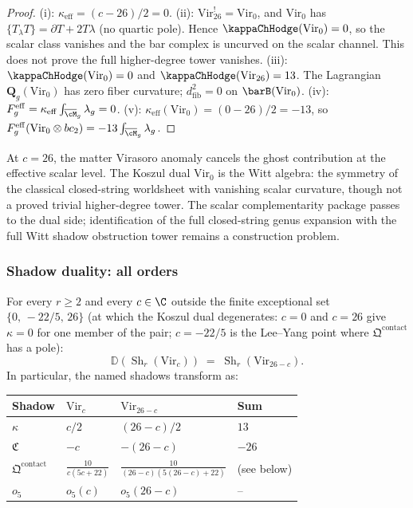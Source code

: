 \begin{proof}
(i): $\kappa_{\mathrm{eff}} = (c-26)/2 = 0$.
(ii): $\mathrm{Vir}_{26}^! = \mathrm{Vir}_0$, and
$\mathrm{Vir}_0$ has $\{T_\lambda T\} = \partial T + 2T\lambda$
(no quartic pole). Hence $\kappaChHodge(\mathrm{Vir}_0) = 0$, so the
scalar class vanishes and the bar complex is uncurved on the scalar
channel. This does not prove the full higher-degree tower vanishes.
(iii): $\kappaChHodge(\mathrm{Vir}_0) = 0$ and $\kappaChHodge(\mathrm{Vir}_{26})
= 13$. The Lagrangian $\mathbf{Q}_g(\mathrm{Vir}_0)$ has zero
fiber curvature; $d_{\mathrm{fib}}^2 = 0$ on $\barB(\mathrm{Vir}_0)$.
(iv): $F_g^{\mathrm{eff}} = \kappa_{\mathrm{eff}} \int_{\overline{\cM}_g} \lambda_g
= 0$.
(v): $\kappa_{\mathrm{eff}}(\mathrm{Vir}_0) = (0-26)/2 = -13$,
so $F_g^{\mathrm{eff}}(\mathrm{Vir}_0 \otimes bc_2)
= -13 \int_{\overline{\cM}_g} \lambda_g$.
\end{proof}

At $c = 26$, the matter Virasoro anomaly cancels the ghost
contribution at the effective scalar level. The Koszul dual
$\mathrm{Vir}_0$ is the Witt algebra: the symmetry of the
classical closed-string worldsheet with vanishing scalar
curvature, though not a proved trivial higher-degree tower.
The scalar complementarity package passes to the dual side;
identification of the full closed-string genus expansion with
the full Witt shadow obstruction tower remains a construction
problem.

\subsubsection*{Shadow duality: all orders}

\begin{theorem}
\label{thm:gravity-shadow-duality}
For every $r \ge 2$ and every $c \in \C$ outside the
finite exceptional set $\{0,\, -22/5,\, 26\}$
\textup{(}at which the Koszul dual degenerates: $c = 0$ and
$c = 26$ give $\kappa = 0$ for one member of the pair;
$c = -22/5$ is the Lee--Yang point where
$\mathfrak{Q}^{\mathrm{contact}}$ has a pole\textup{)}:
\begin{equation}\label{eq:shadow-duality}
\mathbb{D}\!\left(\operatorname{Sh}_r(\mathrm{Vir}_c)\right)
\;=\;
\operatorname{Sh}_r(\mathrm{Vir}_{26-c}).
\end{equation}
In particular, the named shadows transform as:
\begin{center}
\small
\renewcommand{\arraystretch}{1.15}
\begin{tabular}{llll}
\textbf{Shadow} & $\mathrm{Vir}_c$ & $\mathrm{Vir}_{26-c}$
 & \textbf{Sum} \\
\hline
$\kappa$ & $c/2$ & $(26-c)/2$ & $13$ \\[2pt]
$\mathfrak{C}$ & $-c$ & $-(26-c)$ & $-26$ \\[2pt]
$\mathfrak{Q}^{\mathrm{contact}}$
 & $\frac{10}{c(5c+22)}$
 & $\frac{10}{(26-c)(5(26-c)+22)}$
 & \textup{(see below)} \\[2pt]
$o_5$ & $o_5(c)$ & $o_5(26-c)$ & --
\end{tabular}
\end{center}
\end{theorem}

